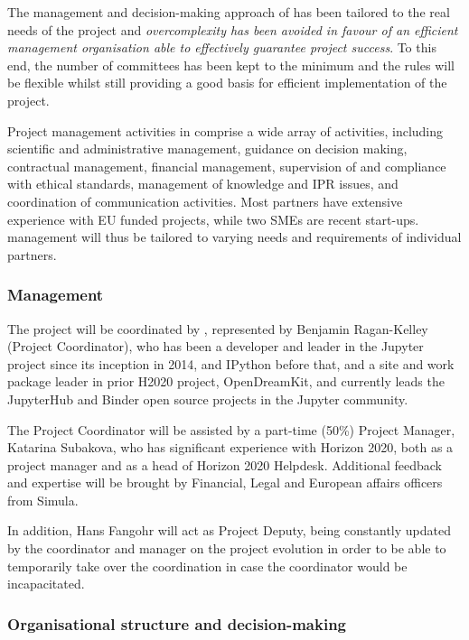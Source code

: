 \label{sect:mgt}

The management and decision-making approach of \TheProject has been
tailored to the real needs of the project and \emph{overcomplexity has been avoided
in favour of an efficient management organisation able to effectively guarantee
project success}. To this end, the number of committees has been kept to
the minimum and the rules will be flexible whilst still providing a good basis
for efficient implementation of the project.

Project management activities in \TheProject comprise a wide array
of activities, including scientific and administrative management,
guidance on decision making, contractual management, financial
management, supervision of and compliance with ethical standards,
management of knowledge and IPR issues, and coordination of
communication activities. Most partners have extensive experience
with EU funded projects, while two SMEs are recent start-ups.
\TheProject management will thus be tailored to varying needs and
requirements of individual partners.

\subsubsection{Management}

The project will be coordinated by ,
represented by Benjamin Ragan-Kelley (Project Coordinator),
who has been a developer and leader in the Jupyter project since its inception in 2014,
and IPython before that,
and a site and work package leader in prior H2020 project, OpenDreamKit,
and currently leads the JupyterHub and Binder open source projects
in the Jupyter community.

The Project Coordinator will be assisted by a part-time (50\%) Project
Manager, Katarina Subakova, who has significant experience with Horizon 2020, both
as a project manager and as a head of Horizon 2020 Helpdesk.
Additional feedback and expertise will be brought by Financial, Legal
and European affairs officers from Simula.

In addition, Hans Fangohr will act as Project Deputy, being constantly
updated by the coordinator and manager on the project evolution in
order to be able to temporarily take over the coordination in case the
coordinator would be incapacitated.

\subsubsection{Organisational structure and decision-making}

